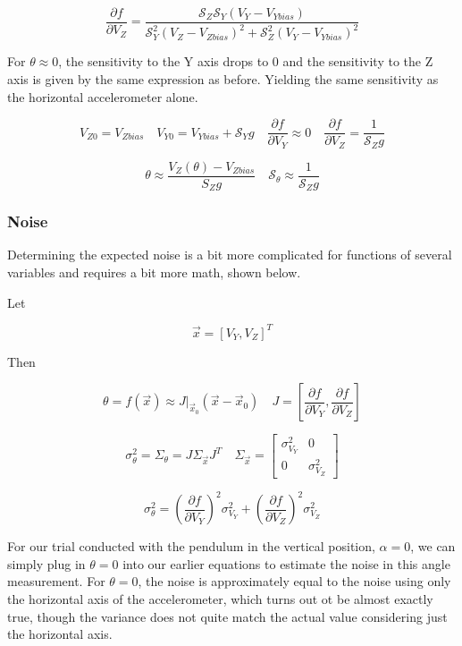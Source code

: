 \documentclass{article}
\theoremstyle{plain}
\theoremstyle{definition}
\theoremstyle{remark}
\newcommand{\Sens}{\mathcal{S}}
\begin{document}
\begin{equation}
\frac{\partial f }{\partial V_Z} = \frac{\Sens_Z \Sens_Y \left(V_{Y} - V_{Ybias} \right)}{\Sens^2_Y \left(V_Z - V_{Zbias} \right) ^2 + \Sens^2_Z \left( V_Y - V_{Ybias}\right)^2}
\label{dualAccel_partialVZ}
\end{equation}

For $\theta \approx 0$, the sensitivity to the Y axis drops to 0 and the sensitivity to the Z axis is given by the same expression as before. 
Yielding the same sensitivity as the horizontal accelerometer alone.

$$ V_{Z0} = V_{Zbias}  \quad  V_{Y0} = V_{Ybias} + \Sens_{Y} g  \quad \frac{\partial f}{\partial V_{Y}} \approx 0  \quad \frac{\partial f }{\partial V_Z} = \frac{1}{\Sens_{Z} g}$$

$$ \theta \approx \frac{V_{Z}(\theta) - V_{Zbias}}{S_Z g}  \quad \Sens_\theta \approx \frac{1}{\Sens_Z g}$$

\subsubsection{Noise}

Determining the expected noise is a bit more complicated for functions of several variables and requires a bit more math, shown below.   

Let 

$$ \vec{x} = \left[ V_Y, V_Z \right]^T $$

Then

$$ \theta = f(\vec{x}) \approx J|_{\vec{x}_0} \left( \vec{x} - \vec{x}_{0}\right) \quad J = \left[ \frac{\partial f}{\partial V_{Y}}, \frac{\partial f }{\partial V_Z} \right] $$

$$ \sigma^2_{\theta} = \Sigma_{\theta} = J \Sigma_{\vec{x}} J^T  \quad 
\Sigma_{\vec{x}} = \left[
\begin{matrix}
\sigma^2_{V_{Y}}  & 0 \\
0 & \sigma^2_{V_{Z}} 
\end{matrix} \right]$$

$$ \sigma^2_{\theta} = \left(\frac{\partial f}{\partial V_{Y}}\right)^2 \sigma^2_{V_{Y}} + \left(\frac{\partial f }{\partial V_Z} \right)^2 \sigma^2_{V_{Z}} $$

For our trial conducted with the pendulum in the vertical position, $\alpha = 0$, we can simply plug in $\theta = 0$ into our earlier equations to estimate the noise in this angle measurement.  For $\theta = 0$, the noise is approximately equal to the noise using only the horizontal axis of the accelerometer, which turns out ot be almost exactly true, though the variance does not quite match the actual value considering just the horizontal axis.
\end{document}
